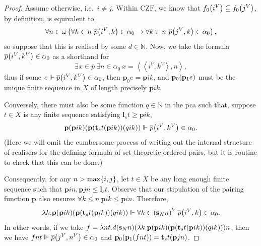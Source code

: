\documentclass[preprint]{elsarticle}
\theoremstyle{plain}
\newcommand{\tuple}[1]{\left\langle #1 \right\rangle}
\begin{document}
\begin{proof}
  Assume otherwise, i.e.\ $i \neq j$. Within $\mathrm{CZF}$, we know that $f_0\mleft(i^V\mright) \subseteq f_0\mleft(j^V\mright)$, by definition, is equivalent to
  \[\forall n \in \omega \left(\forall k \in n \ \overline{p}\mleft(i^V, k\mright) \in \alpha_0 \rightarrow \forall k \in n \ \overline{p}\mleft(j^V, k\mright) \in \alpha_0\right),\]
  so suppose that this is realised by some $d \in \mathbb{N}$. Now, we take the formula $\overline{p}\mleft(i^V, k^V\mright) \in \alpha_0$ as a shorthand for
  \[\exists x \in \overline{p} \ \exists n \in \alpha_0 \ x = \tuple{\tuple{i^V, k^V}, n},\]
  thus if some $e \Vdash \overline{p}\mleft(i^V, k^V\mright) \in \alpha_0$, then $\mathbf{p}_0 e = \mathbf{p}ik$, and $\mathbf{p}_0 \mleft(\mathbf{p}_1 e\mright)$ must be the unique finite sequence in $X$ of length precisely $\mathbf{p}ik$.

  Conversely, there must also be some function $q \in \mathbb{N}$ in the pca such that, suppose $t \in X$ is any finite sequence satisfying $\mathbf{l}_s t \geq \mathbf{p}ik$,
  \[\mathbf{p} \mleft(\mathbf{p}ik\mright) \mleft(\mathbf{p} \mleft(\mathbf{t}_s t \mleft(\mathbf{p}ik\mright)\mright) \mleft(qik\mright)\mright) \Vdash \overline{p}\mleft(i^V, k^V\mright) \in \alpha_0.\]
  (Here we will omit the cumbersome process of writing out the internal structure of realisers for the defining formula of set-theoretic ordered pairs, but it is routine to check that this can be done.)

  Consequently, for any $n > \mathrm{max}\mleft\{i, j\mright\}$, let $t \in X$ be any long enough finite sequence such that $\mathbf{p}in, \mathbf{p}jn \leq \mathbf{l}_s t$. Observe that our stipulation of the pairing function $\mathbf{p}$ also ensures $\forall k \leq n \ \mathbf{p}ik \leq \mathbf{p}in$. Therefore,
  \[\lambda k. \mathbf{p} \mleft(\mathbf{p}ik\mright) \mleft(\mathbf{p} \mleft(\mathbf{t}_s t \mleft(\mathbf{p}ik\mright)\mright) \mleft(qik\mright)\mright) \Vdash \forall k \in \left(\mathbf{s}_N n\right)^V \overline{p}\mleft(i^V, k\mright) \in \alpha_0.\]
  In other words, if we take $f = \lambda nt. d\mleft(\mathbf{s}_N n\mright) \mleft(\lambda k. \mathbf{p} \mleft(\mathbf{p}ik\mright) \mleft(\mathbf{p} \mleft(\mathbf{t}_s t \mleft(\mathbf{p}ik\mright)\mright) \mleft(qik\mright)\mright)\mright) n$, then we have $fnt \Vdash \overline{p}\mleft(j^V, n^V\mright) \in \alpha_0$ and $\mathbf{p}_0 \mleft(\mathbf{p}_1 \mleft(fnt\mright)\mright) = \mathbf{t}_s t \mleft(\mathbf{p}jn\mright)$.


\end{proof}
\end{document}
